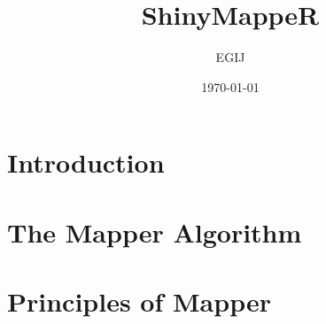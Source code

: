 \documentclass[11pt]{amsart}
\title{ShinyMappeR}
\author{EGIJ}
\date{\today}
\theoremstyle{plain}
\theoremstyle{definition}
\theoremstyle{remark}
\begin{document}
\begin{abstract}

\end{abstract}

\maketitle

\section{Introduction}



\section{The Mapper Algorithm}



\section{Principles of Mapper}




\newpage



\printbibliography
\end{document}
